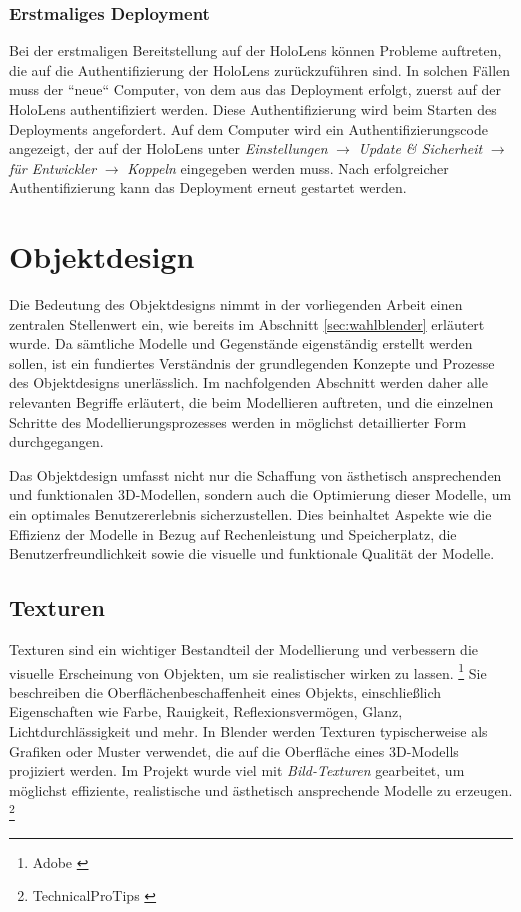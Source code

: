 \subsubsection{Erstmaliges Deployment}
Bei der erstmaligen Bereitstellung auf der HoloLens können Probleme auftreten, die auf die Authentifizierung der HoloLens zurückzuführen sind. In solchen Fällen muss der ``neue`` Computer, von dem aus das Deployment erfolgt, zuerst auf der HoloLens authentifiziert werden. Diese Authentifizierung wird beim Starten des Deployments angefordert. Auf dem Computer wird ein Authentifizierungscode angezeigt, der auf der HoloLens unter \textit{Einstellungen} $\rightarrow$ \textit{Update \& Sicherheit} $\rightarrow$ \textit{für Entwickler} $\rightarrow$ \textit{Koppeln} eingegeben werden muss. Nach erfolgreicher Authentifizierung kann das Deployment erneut gestartet werden.

\section{Objektdesign}
Die Bedeutung des Objektdesigns nimmt in der vorliegenden Arbeit einen zentralen Stellenwert ein, wie bereits im Abschnitt \ref{sec:wahlblender} erläutert wurde. Da sämtliche Modelle und Gegenstände eigenständig erstellt werden sollen, ist ein fundiertes Verständnis der grundlegenden Konzepte und Prozesse des Objektdesigns unerlässlich. Im nachfolgenden Abschnitt werden daher alle relevanten Begriffe erläutert, die beim Modellieren auftreten, und die einzelnen Schritte des Modellierungsprozesses werden in möglichst detaillierter Form durchgegangen.

Das Objektdesign umfasst nicht nur die Schaffung von ästhetisch ansprechenden und funktionalen 3D-Modellen, sondern auch die Optimierung dieser Modelle, um ein optimales Benutzererlebnis sicherzustellen. Dies beinhaltet Aspekte wie die Effizienz der Modelle in Bezug auf Rechenleistung und Speicherplatz, die Benutzerfreundlichkeit sowie die visuelle und funktionale Qualität der Modelle.

\subsection{Texturen}
Texturen sind ein wichtiger Bestandteil der Modellierung und verbessern die visuelle Erscheinung von Objekten, um sie realistischer wirken zu lassen. \footnote{Adobe \cite{What are 3d textures}}  Sie beschreiben die Oberflächenbeschaffenheit eines Objekts, einschließlich Eigenschaften wie Farbe, Rauigkeit, Reflexionsvermögen, Glanz, Lichtdurchlässigkeit und mehr. In Blender werden Texturen typischerweise als Grafiken oder Muster verwendet, die auf die Oberfläche eines 3D-Modells projiziert werden. Im Projekt wurde viel mit \textit{Bild-Texturen} gearbeitet, um möglichst effiziente, realistische und ästhetisch ansprechende Modelle zu erzeugen. \footnote{TechnicalProTips \cite{Textur}}

